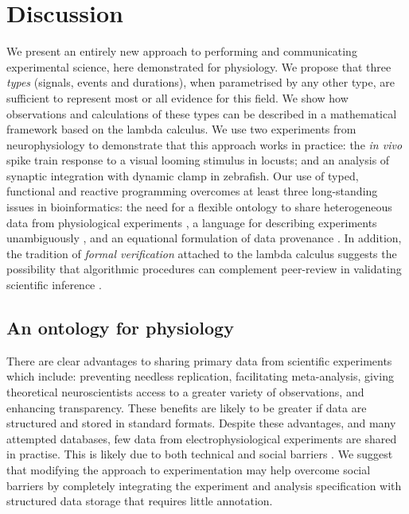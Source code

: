 \section*{Discussion}

We present an entirely new approach to performing and communicating
experimental science, here demonstrated for physiology. We propose
that three \emph{types} (signals, events and durations), when
parametrised by any other type, are sufficient to represent most or
all evidence for this field. We show how observations and calculations
of these types can be described in a mathematical framework based on
the lambda calculus. We use two experiments from neurophysiology to
demonstrate that this approach works in practice: the \emph{in vivo}
spike train response to a visual looming stimulus in locusts; and an
analysis of synaptic integration with dynamic clamp in zebrafish. Our use
of typed, functional and reactive programming overcomes at least three
long-standing issues in bioinformatics: the need for a flexible
ontology to share heterogeneous data from physiological experiments
\citep{Amari2002}, a language for describing experiments unambiguously
\citep{Murray-Rust2002}, and an equational formulation of data
provenance \citep{Pool2002}. In addition, the tradition of
\emph{formal verification} attached to the lambda calculus
\citep{Bird1996,Hindley2008}
suggests the possibility that algorithmic procedures can complement
peer-review in validating scientific inference
\citep{Harrison2009,Kennedy1997,Taylor1997}.

\subsection*{An ontology for physiology}

There are clear advantages to sharing primary data from scientific
experiments \citep{Insel2003} which include: preventing needless replication,
facilitating meta-analysis, giving theoretical neuroscientists access
to a greater variety of observations, and enhancing transparency. These
benefits are likely to be greater if data are structured and stored in
standard formats. Despite these advantages, and many attempted
databases, few data from electrophysiological experiments are
shared in practise. This is likely due to both technical and social
barriers \citep{Amari2002}. We suggest that modifying the approach to
experimentation may help overcome social barriers by completely
integrating the experiment and analysis specification with structured
data storage that requires little annotation.

